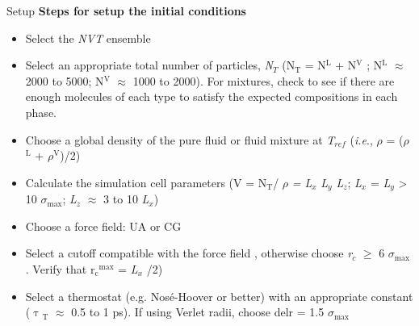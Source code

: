 \documentclass[9pt,bestpractices]{livecoms}
\begin{document}
\begin{Checklists*}[p!]
\begin{checklist}{Setup}
\textbf{Steps for setup the initial conditions}
\begin{itemize}
\item Select the \textit{NVT} ensemble \\
\item Select an appropriate total number of particles, \textit{N}$_{T}$ (N$_{\mathrm{T}}$ = N$^{\mathrm{L}}$ + N$^{\mathrm{V}}$ ; N$^{\mathrm{L}}$ ${\approx}$ 2000 to 5000; N$^{\mathrm{V}}$ ${\approx}$ 1000 to 2000). For mixtures, check to see if there are enough molecules of each type to satisfy the expected compositions in each phase. \\
\item Choose a global density of the pure fluid or fluid mixture at \textit{T}$_{ref}$ (\textit{i.e}., {${\rho}$} = ({${\rho}$}$^{\mathrm{L}}$ + {${\rho}$}$^{\mathrm{V}}$)/2) \\
\item Calculate the simulation cell parameters (V = N$_{\mathrm{T}}$/ {${\rho}$} \textit{= L}$_{x}$ \textit{L}$_{y}$ \textit{L}$_{z}$; \textit{L}$_{x}$ = \textit{L}$_{y}$ {\textgreater} 10 ${\sigma}$$_{\mathrm{max}}$;  \textit{L}$_{z}$ ${\approx}$ 3 to 10 \textit{L}$_{x}$)  \\
\item Choose a force field: UA or CG \\
\item Select a cutoff compatible with the force field , otherwise choose \textit{r}$_{c}$ ${\geq}$ 6 ${\sigma}$$_{\mathrm{max}}$ . Verify that r$_{\mathrm{c}}$$^{\mathrm{max}}$ = \textit{L}$_{x}$ /2) \\
\item Select a thermostat (e.g. Nos\'e-Hoover or better) with an appropriate constant (${\uptau}$$_{\mathrm{T}}$ ${\approx}$ 0.5 to 1 ps). If using Verlet radii, choose delr = 1.5 ${\sigma}$$_{\mathrm{max}}$ \\
$$
\end{itemize}
\end{checklist}
\end{Checklists*}
\end{document}
